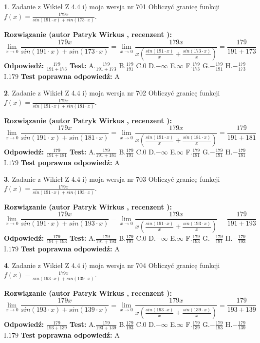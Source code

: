 \documentclass[12pt, a4paper]{article}
\theoremstyle{definition} %
\newtheorem{zad}{}
\newcommand{\zadStart}[1]{\begin{zad}#1\newline}
\newcommand{\zadStop}{\end{zad}}
\newcommand{\rozwStart}[2]{\noindent \textbf{Rozwiązanie (autor #1 , recenzent #2): }\newline}
\newcommand{\rozwStop}{\newline}
\newcommand{\odpStart}{\noindent \textbf{Odpowiedź:}\newline}
\newcommand{\odpStop}{\newline}
\newcommand{\testStart}{\noindent \textbf{Test:}\newline}
\newcommand{\testStop}{\newline}
\newcommand{\kluczStart}{\noindent \textbf{Test poprawna odpowiedź:}\newline}
\newcommand{\kluczStop}{\newline}
\begin{document}
\zadStart{Zadanie z Wikieł Z 4.4 i) moja wersja nr 701}
Obliczyć granicę funkcji $f(x)=\frac{179x}{sin(191\cdot x) +sin(173\cdot x)}$.
\zadStop
\rozwStart{Patryk Wirkus}{}
$$\lim\limits_{x\to 0}\frac{179x}{sin(191\cdot x) +sin(173\cdot x)}=\lim\limits_{x\to 0}\frac{179x}{x(\frac{sin(191\cdot x)}{x}+\frac{sin(173\cdot x)}{x})}=\frac{179}{191+173}$$
\rozwStop
\odpStart
$\frac{179}{191+173}$
\odpStop
\testStart
A.$\frac{179}{191+173}$
B.$\frac{179}{191}$
C.$0$
D.$-\infty$
E.$\infty$
F.$\frac{179}{173}$
G.$-\frac{179}{191}$
H.$-\frac{179}{173}$
I.$179$
\testStop
\kluczStart
A
\kluczStop



\zadStart{Zadanie z Wikieł Z 4.4 i) moja wersja nr 702}
Obliczyć granicę funkcji $f(x)=\frac{179x}{sin(191\cdot x) +sin(181\cdot x)}$.
\zadStop
\rozwStart{Patryk Wirkus}{}
$$\lim\limits_{x\to 0}\frac{179x}{sin(191\cdot x) +sin(181\cdot x)}=\lim\limits_{x\to 0}\frac{179x}{x(\frac{sin(191\cdot x)}{x}+\frac{sin(181\cdot x)}{x})}=\frac{179}{191+181}$$
\rozwStop
\odpStart
$\frac{179}{191+181}$
\odpStop
\testStart
A.$\frac{179}{191+181}$
B.$\frac{179}{191}$
C.$0$
D.$-\infty$
E.$\infty$
F.$\frac{179}{181}$
G.$-\frac{179}{191}$
H.$-\frac{179}{181}$
I.$179$
\testStop
\kluczStart
A
\kluczStop



\zadStart{Zadanie z Wikieł Z 4.4 i) moja wersja nr 703}
Obliczyć granicę funkcji $f(x)=\frac{179x}{sin(191\cdot x) +sin(193\cdot x)}$.
\zadStop
\rozwStart{Patryk Wirkus}{}
$$\lim\limits_{x\to 0}\frac{179x}{sin(191\cdot x) +sin(193\cdot x)}=\lim\limits_{x\to 0}\frac{179x}{x(\frac{sin(191\cdot x)}{x}+\frac{sin(193\cdot x)}{x})}=\frac{179}{191+193}$$
\rozwStop
\odpStart
$\frac{179}{191+193}$
\odpStop
\testStart
A.$\frac{179}{191+193}$
B.$\frac{179}{191}$
C.$0$
D.$-\infty$
E.$\infty$
F.$\frac{179}{193}$
G.$-\frac{179}{191}$
H.$-\frac{179}{193}$
I.$179$
\testStop
\kluczStart
A
\kluczStop



\zadStart{Zadanie z Wikieł Z 4.4 i) moja wersja nr 704}
Obliczyć granicę funkcji $f(x)=\frac{179x}{sin(193\cdot x) +sin(139\cdot x)}$.
\zadStop
\rozwStart{Patryk Wirkus}{}
$$\lim\limits_{x\to 0}\frac{179x}{sin(193\cdot x) +sin(139\cdot x)}=\lim\limits_{x\to 0}\frac{179x}{x(\frac{sin(193\cdot x)}{x}+\frac{sin(139\cdot x)}{x})}=\frac{179}{193+139}$$
\rozwStop
\odpStart
$\frac{179}{193+139}$
\odpStop
\testStart
A.$\frac{179}{193+139}$
B.$\frac{179}{193}$
C.$0$
D.$-\infty$
E.$\infty$
F.$\frac{179}{139}$
G.$-\frac{179}{193}$
H.$-\frac{179}{139}$
I.$179$
\testStop
\kluczStart
A
\kluczStop
\end{document}
